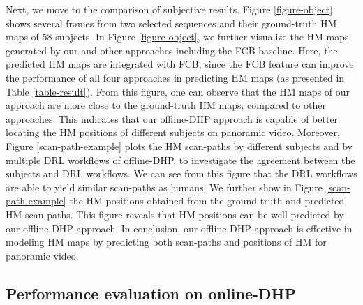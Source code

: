 \documentclass[10pt,journal,compsoc]{IEEEtran}
\begin{document}
Next, we move to the comparison of subjective results. Figure \ref{figure-object} shows several frames from two selected sequences and their ground-truth HM maps of 58 subjects.
In Figure \ref{figure-object}, we further visualize the HM maps generated by our and other approaches including the FCB baseline. Here, the predicted HM maps are integrated with FCB, since the FCB feature can improve the performance of all four approaches in predicting HM maps (as presented in Table \ref{table-result}).
From this figure, one can observe that the HM maps of our approach are more close to the ground-truth HM maps, compared to other approaches.
This indicates that our offline-DHP approach is capable of better locating the HM positions of different subjects on panoramic video.
Moreover, Figure \ref{scan-path-example} plots the HM scan-paths by different subjects and by multiple DRL workflows of offline-DHP, to investigate the agreement between the subjects and DRL workflows.
We can see from this figure that the DRL workflows are able to yield similar scan-paths as humans.  We further show in Figure \ref{scan-path-example} the HM positions obtained from the ground-truth and predicted HM scan-paths. This figure reveals that HM positions can be well predicted by our offline-DHP approach. In conclusion, our offline-DHP approach is effective in modeling HM maps by predicting both scan-paths and positions of HM for panoramic video.


\subsection{Performance evaluation on online-DHP}\label{sec:evaluation_online}
\label{online-compare}

\end{document}
